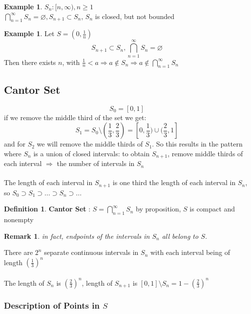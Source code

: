 \documentclass[12pt]{article}
\theoremstyle{plain}
\newtheorem*{remark}{Remark}
\theoremstyle{definition}
\newtheorem{definition}[theorem]{Definition}
\newtheorem{example}[theorem]{Example}
\begin{document}
\begin{example}
	$S_n : [n, \infty), n\geq 1$\\
	$\bigcap^\infty_{n=1} S_n = \varnothing, S_{n+1} \subset S_n$, $S_n$ is closed, but not bounded
\end{example}

\begin{example}
	Let $S = (0, \frac{1}{n})$
	$$S_{n+1} \subset S_n, \bigcap^\infty_{n=1} S_n = \varnothing$$
	Then there exists $n$, with $\frac{1}{n} < a \Longrightarrow a \not\in S_n \Longrightarrow a \not\in \bigcap^\infty_{n=1} S_n$
\end{example}

\subsection{Cantor Set}

$$S_0 = [0,1]$$
if we remove the middle third of the set we get:
$$S_1 = S_0 \setminus (\frac{1}{3}, \frac{2}{3}) = [0,\frac{1}{3}) \cup (\frac{2}{3}, 1]$$ 
and for $S_2$ we will remove the middle thirds of $S_1$. So this results in the pattern where $S_n$ is a union of closed intervals: to obtain $S_{n+1}$, remove middle thirds of each interval $\Longrightarrow$ the number of intervals in $S_n$\\
\\
The length of each interval in $S_{n+1} $ is one third the length of each interval in $S_n$, so
$S_0 \supset S_1\supset ... \supset S_n \supset...$

\begin{definition}
	\textbf{Cantor Set} : $S = \bigcap^\infty_{n=1} S_n$ by proposition, $S$ is compact and nonempty
\end{definition}

\begin{remark}
	in fact, endpoints of the intervals in $S_n$ all belong to $S$.
\end{remark}

There are $2^n$ separate continuous intervals in $S_n$ with each interval being of length $(\frac{1}{3})^n$\\
\\
The length of $S_n$ is $(\frac{2}{3})^n$, length of $S_{n+1}$ is $[0,1] \setminus S_n = 1-(\frac{2}{3})^n$

\subsubsection{Description of Points in $S$}
\end{document}

